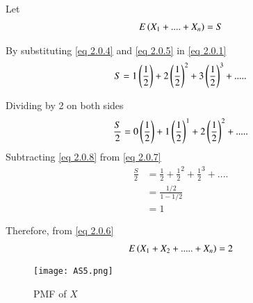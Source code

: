 \documentclass[journal,12pt,twocolumn]{IEEEtran}
\begin{document}
Let 
\begin{align}
    E\left(X_1 + .... + X_n\right) = S \label{eq 2.0.6}
\end{align}

By substituting \eqref{eq 2.0.4} and \eqref{eq 2.0.5} in \eqref{eq 2.0.1}
\begin{align}
    S = 1 \left(\frac{1}{2}\right) + 2 \left(\frac{1}{2}\right)^{2} + 3\left(\frac{1}{2}\right)^{3} + ..... \label{eq 2.0.7}
\end{align}

Dividing by 2 on both sides 
\begin{align}
   \frac{S}{2} =  0\left(\frac{1}{2}\right) + 1\left(\frac{1}{2}\right)^{1} + 2\left(\frac{1}{2}\right)^{2} + ..... \label{eq 2.0.8}
\end{align}
Subtracting \eqref{eq 2.0.8} from \eqref{eq 2.0.7}
\begin{align}
    \frac{S}{2} 
    &= \frac{1}{2} + \frac{1}{2}^{2} + \frac{1}{2}^{3}  + ....\\
    &= \frac{1/2}{1-1/2} \\
    &= 1
\end{align}

Therefore, from \eqref{eq 2.0.6}
\begin{align}
    E \left(X_1 + X_2 +..... + X_n\right) = 2
\end{align}

\begin{figure}[h]
    \centering
    \texttt{[image: AS5.png]}
    \caption{PMF of $X$  }
    \label{beta}
\end{figure}
\end{document}

